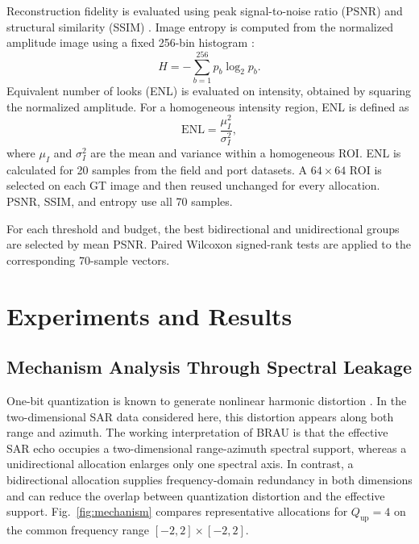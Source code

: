 \documentclass[conference]{IEEEtran}
\begin{document}
Reconstruction fidelity is evaluated using peak signal-to-noise ratio (PSNR) and structural similarity (SSIM) \cite{wang2004ssim}. Image entropy is computed from the normalized amplitude image using a fixed 256-bin histogram \cite{shannon1948communication}:
\begin{equation}
    H=-\sum_{b=1}^{256}p_b\log_2 p_b.
\end{equation}
Equivalent number of looks (ENL) is evaluated on intensity, obtained by squaring the normalized amplitude. For a homogeneous intensity region, ENL is defined as \cite{feng2015tgv}
\begin{equation}
    \mathrm{ENL}=\frac{\mu_I^2}{\sigma_I^2},
\end{equation}
where $\mu_I$ and $\sigma_I^2$ are the mean and variance within a homogeneous ROI. ENL is calculated for 20 samples from the field and port datasets. A $64\times64$ ROI is selected on each GT image and then reused unchanged for every allocation. PSNR, SSIM, and entropy use all 70 samples.

For each threshold and budget, the best bidirectional and unidirectional groups are selected by mean PSNR. Paired Wilcoxon signed-rank tests \cite{wilcoxon1945ranking} are applied to the corresponding 70-sample vectors.

\section{Experiments and Results}

\subsection{Mechanism Analysis Through Spectral Leakage}

One-bit quantization is known to generate nonlinear harmonic distortion \cite{franceschetti1999phase,zhao2019onebit,si2023dequantization}. In the two-dimensional SAR data considered here, this distortion appears along both range and azimuth. The working interpretation of BRAU is that the effective SAR echo occupies a two-dimensional range-azimuth spectral support, whereas a unidirectional allocation enlarges only one spectral axis. In contrast, a bidirectional allocation supplies frequency-domain redundancy in both dimensions and can reduce the overlap between quantization distortion and the effective support. Fig.~\ref{fig:mechanism} compares representative allocations for $Q_{\mathrm{up}}=4$ on the common frequency range $[-2,2]\times[-2,2]$.
\end{document}
